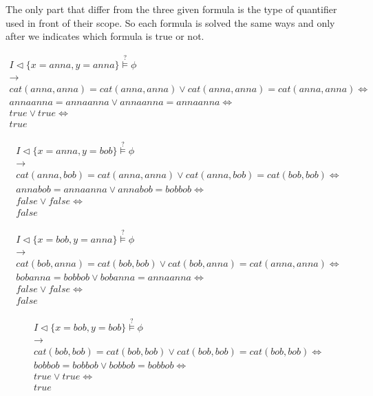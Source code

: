 \documentclass[a4paper,11pt]{report}
\begin{document}
The only part that differ from the three given formula is the type of quantifier
used in front of their scope. So each formula is solved the same ways and only
after we indicates which formula is true or not.

\begin{gather*}
  I \lhd \{x = anna, y = anna \} \overset{?}{\models} \phi \\
  \longrightarrow \\
  cat(anna,anna) = cat(anna,anna) \vee cat(anna,anna) = cat(anna,anna) \Leftrightarrow \\
  annaanna = annaanna \vee annaanna = annaanna \Leftrightarrow \\
  true \vee true \Leftrightarrow \\
  true
\end{gather*}

\begin{gather*}
  I \lhd \{x = anna, y = bob \} \overset{?}{\models} \phi \\
  \longrightarrow \\
  cat(anna,bob) = cat(anna,anna) \vee cat(anna,bob) = cat(bob,bob) \Leftrightarrow \\
  annabob = annaanna \vee annabob = bobbob \Leftrightarrow \\
  false \vee false \Leftrightarrow \\
  false
\end{gather*}

\begin{gather*}
  I \lhd \{x = bob, y = anna \} \overset{?}{\models} \phi \\
  \longrightarrow \\
  cat(bob,anna) = cat(bob,bob) \vee cat(bob,anna) = cat(anna,anna) \Leftrightarrow \\
  bobanna = bobbob \vee bobanna = annaanna \Leftrightarrow \\
  false \vee false \Leftrightarrow \\
  false
\end{gather*}

\begin{gather*}
  I \lhd \{x = bob, y = bob \} \overset{?}{\models} \phi \\
  \longrightarrow \\
  cat(bob,bob) = cat(bob,bob) \vee cat(bob,bob) = cat(bob,bob) \Leftrightarrow \\
  bobbob = bobbob \vee bobbob = bobbob \Leftrightarrow \\
  true \vee true \Leftrightarrow \\
  true
\end{gather*}
\end{document}
